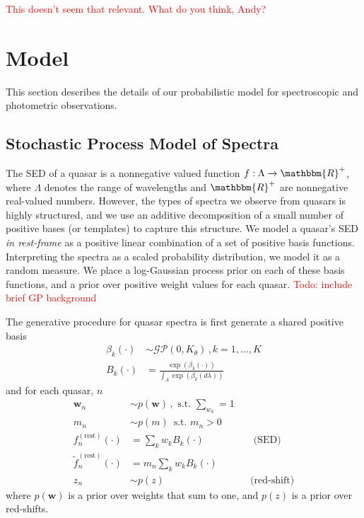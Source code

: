 \documentclass{article}
\newcommand{\R}{\mathbbm{R}}
\newcommand{\red}[1]{\textcolor{red}{#1}}
\begin{document}
\red{This doesn't seem that relevant. What do you think, Andy?}


\section{Model}
This section describes the details of our probabilistic model for spectroscopic and photometric observations.  

\subsection{Stochastic Process Model of Spectra}
The SED of a quasar is a nonnegative valued function $f : \Lambda \rightarrow \R^+$, where $\Lambda$ denotes the range of wavelengths and $\R^+$ are nonnegative real-valued numbers.  However, the types of spectra we observe from quasars is highly structured, and we use an additive decomposition of a small number of positive bases (or templates) to capture this structure.   We model a quasar's SED \emph{in rest-frame} as a positive linear combination of a set of positive basis functions.  Interpreting the spectra as a scaled probability distribution, we model it as a random measure.  We place a log-Gaussian process prior on each of these basis functions, and a prior over positive weight values for each quasar.  
\red{Todo: include brief GP background}

The generative procedure for quasar spectra is first generate a shared positive basis
\begin{align}
  \beta_k(\cdot) &\sim \mathcal{GP}(0, K_\theta) \, , k=1, \dots, K\\
  B_k(\cdot) &= \frac{\exp(\beta_k(\cdot))}{\int_\Lambda \exp(\beta_k(d \lambda))}   
\end{align}
and for each quasar, $n$
\begin{align}
  \mathbf{w}_n &\sim p(\mathbf{w}) \, , \text{ s.t. } \sum_{w_k} = 1  \\
  m_n  &\sim p(m) \, \text{ s.t. } m_n > 0 \\
  f^{(\text{rest})}_n(\cdot) &= \sum_{k} w_k B_k(\cdot) &&\text{ (SED) }\\
  \tilde f^{(\text{rest})}_n(\cdot) &= m_n \sum_{k} w_k B_k(\cdot) \\
  z_n &\sim p(z) &&\text{(red-shift)}
\end{align}
where $p(\mathbf{w})$ is a prior over weights that sum to one, and $p(z)$ is a prior over red-shifts. 
\end{document}
